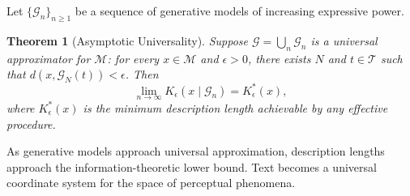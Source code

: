 \documentclass[11pt,a4paper]{article}
\newtheorem{theorem}{Theorem}[section]
\theoremstyle{definition}
\theoremstyle{remark}
\begin{document}
Let $\{\mathcal{G}_n\}_{n \ge 1}$ be a sequence of generative models of increasing expressive power.

\begin{theorem}[Asymptotic Universality]
Suppose $\mathcal{G} = \bigcup_n \mathcal{G}_n$ is a universal approximator for $\mathcal{M}$: for every $x \in \mathcal{M}$ and $\epsilon > 0$, there exists $N$ and $t \in \mathcal{T}$ such that $d(x, \mathcal{G}_N(t)) < \epsilon$. Then
\[
\lim_{n \to \infty} K_\epsilon(x \mid \mathcal{G}_n) = K_\epsilon^*(x),
\]
where $K_\epsilon^*(x)$ is the minimum description length achievable by any effective procedure.
\end{theorem}

As generative models approach universal approximation, description lengths approach the information-theoretic lower bound. Text becomes a universal coordinate system for the space of perceptual phenomena.
\end{document}
